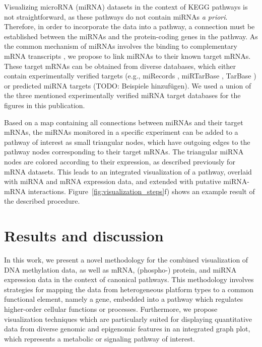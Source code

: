 \documentclass{bioinfo}
\begin{document}
Visualizing microRNA (miRNA) datasets in the context of KEGG pathways is not straightforward, as
these pathways do not contain miRNAs \emph{a priori}. Therefore, in order to incorporate the data into a
pathway, a connection must be established between the miRNAs and the protein-coding genes
in the pathway. As the common mechanism of miRNAs involves the binding to complementary mRNA
transcripts \citep{Bartel2004}, we propose to link miRNAs to their known target mRNAs. These target
mRNAs can be obtained from diverse databases, which either contain experimentally verified targets
(e.g., miRecords \citep[see][]{miRecords}, miRTarBase \citep[see][]{miRTarBase}, TarBase
\citep[see][]{TarBase}) or predicted miRNA targets \citep[reviewed in][]{Alexiou2009} (TODO: Beispiele hinzufügen).
We used a union of the three mentioned experimentally verified miRNA target databases for the figures in this publication.


Based on a map containing all connections between miRNAs and their target mRNAs, the miRNAs
monitored in a specific experiment can be added to a pathway of interest as small triangular nodes,
which have outgoing edges to the pathway nodes corresponding to their target mRNAs. The triangular
miRNA nodes are colored according to their expression, as described previously for mRNA datasets.
This leads to an integrated visualization of a pathway, overlaid with miRNA and mRNA expression
data, and extended with putative miRNA-mRNA interactions. Figure~\ref{fig:visualization_steps}f)
shows an example result of the described procedure.


\section{Results and discussion}

In this work, we present a novel methodology for the combined visualization of DNA methylation data,
as well as mRNA, (phospho-) protein, and miRNA expression data in the context of canonical pathways.
This methodology involves strategies for mapping the data from heterogeneous platform types to a common
functional element, namely a gene, embedded into a pathway which regulates higher-order cellular
functions or processes. Furthermore, we propose visualization techniques which are particularly suited for
displaying quantitative data from diverse genomic and epigenomic features in an integrated graph plot,
which represents a metabolic or signaling pathway of interest.
\end{document}
